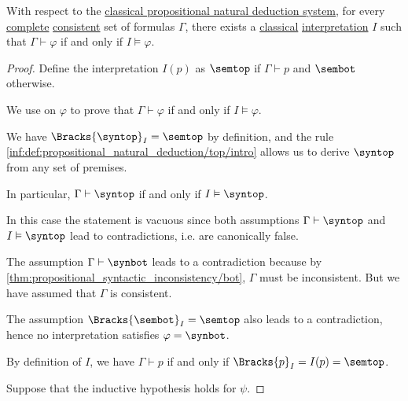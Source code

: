 \begin{theorem}\label{thm:propositional_model_existence_theorem}
  With respect to the \hyperref[def:propositional_natural_deduction_system]{classical propositional natural deduction system}, for every \hyperref[def:propositional_theory/complete]{complete} \hyperref[def:propositional_theory/consistent]{consistent} set of formulas \( \Gamma \), there exists a \hyperref[def:truth_value_algebra/classical]{classical} \hyperref[def:propositional_interpretation]{interpretation} \( I \) such that \( \Gamma \vdash \varphi \) if and only if \( I \vDash \varphi \).
\end{theorem}
\begin{proof}
  Define the interpretation \( I(p) \) as \( \semtop \) if \( \Gamma \vdash p \) and \( \sembot \) otherwise.

  We use  on \( \varphi \) to prove that \( \Gamma \vdash \varphi \) if and only if \( I \vDash \varphi \).

   We have \( \Bracks{\syntop}_I = \semtop \) by definition, and the rule \ref{inf:def:propositional_natural_deduction/top/intro} allows us to derive \( \syntop \) from any set of premises.

  In particular, \( \Gamma \vdash \syntop \) if and only if \( I \vDash \syntop \).

   In this case the statement is vacuous since both assumptions \( \Gamma \vdash \syntop \) and \( I \vDash \syntop \) lead to contradictions, i.e. are canonically false.

  \SufficiencySubProof* The assumption \( \Gamma \vdash \synbot \) leads to a contradiction because by \cref{thm:propositional_syntactic_inconsistency/bot}, \( \Gamma \) must be inconsistent. But we have assumed that \( \Gamma \) is consistent.

  \SufficiencySubProof* The assumption \( \Bracks{\sembot}_I = \semtop \) also leads to a contradiction, hence no interpretation satisfies \( \varphi = \synbot \).

   By definition of \( I \), we have \( \Gamma \vdash p \) if and only if \( \Bracks{p}_I = I(p) = \semtop \).

   Suppose that the inductive hypothesis holds for \( \psi \).


\end{proof}
